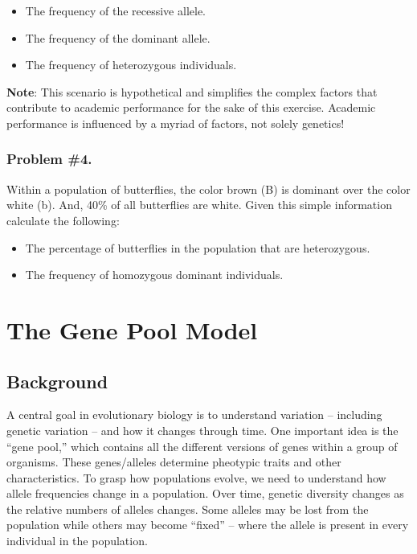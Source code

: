 \documentclass[
  a4paper]{book}
\providecommand{\tightlist}{%
  \setlength{\itemsep}{0pt}\setlength{\parskip}{0pt}}
\begin{document}
\begin{itemize}
\tightlist
\item
  The frequency of the recessive allele.
\item
  The frequency of the dominant allele.
\item
  The frequency of heterozygous individuals.
\end{itemize}

\textbf{Note}: This scenario is hypothetical and simplifies the complex factors that contribute to academic performance for the sake of this exercise. Academic performance is influenced by a myriad of factors, not solely genetics!

\subsection{Problem \#4.}\label{problem-4.}

Within a population of butterflies, the color brown (B) is dominant over the color white (b). And, 40\% of all butterflies are white. Given this simple information calculate the following:

\begin{itemize}
\tightlist
\item
  The percentage of butterflies in the population that are heterozygous.
\item
  The frequency of homozygous dominant individuals.
\end{itemize}

\chapter{The Gene Pool Model}\label{the-gene-pool-model}

\section{Background}\label{background-12}

A central goal in evolutionary biology is to understand variation -- including genetic variation -- and how it changes through time. One important idea is the ``gene pool,'' which contains all the different versions of genes within a group of organisms. These genes/alleles determine pheotypic traits and other characteristics. To grasp how populations evolve, we need to understand how allele frequencies change in a population. Over time, genetic diversity changes as the relative numbers of alleles changes. Some alleles may be lost from the population while others may become ``fixed'' -- where the allele is present in every individual in the population.
\end{document}
